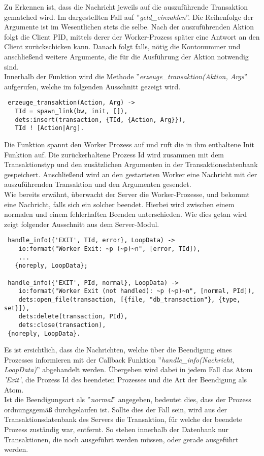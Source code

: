 Zu Erkennen ist, dass die Nachricht jeweils auf die auszuführende Transaktion gematched wird. Im dargestellten Fall auf ''\textit{geld\_einzahlen}''. Die Reihenfolge der Argumente ist im Wesentlichen stets die selbe. Nach der auszuführenden Aktion folgt die Client PID, mittels derer der Worker-Prozess später eine Antwort an den Client zurückschicken kann. Danach folgt falls, nötig die Kontonummer und anschließend weitere Argumente, die für die Ausführung der Aktion notwendig sind.\\
Innerhalb der Funktion wird die Methode ''\textit{erzeuge\_transaktion(Aktion, Args}'' aufgerufen, welche im folgenden Ausschnitt gezeigt wird.
\begin{lstlisting}
 erzeuge_transaktion(Action, Arg) ->
   TId = spawn_link(bw, init, []),
   dets:insert(transaction, {TId, {Action, Arg}}),
   TId ! [Action|Arg].
\end{lstlisting}
Die Funktion spannt den Worker Prozess auf und ruft die in ihm enthaltene Init Funktion auf. Die zurückerhaltene Prozess Id wird zusammen mit dem Transaktionstyp und den zusätzlichen Argumenten in der Transaktionsdatenbank gespeichert. Anschließend wird an den gestarteten Worker eine Nachricht mit der auszuführenden Transaktion und den Argumenten gesendet.\\
Wie bereits erwähnt, überwacht der Server die Worker-Prozesse, und bekommt eine Nachricht, falls sich ein solcher beendet. Hierbei wird zwischen einem normalen und einem fehlerhaften Beenden unterschieden. Wie dies getan wird zeigt folgender Ausschnitt aus dem Server-Modul.
\begin{lstlisting}
 handle_info({'EXIT', TId, error}, LoopData) -> 
    io:format("Worker Exit: ~p (~p)~n", [error, TId]),
    ...
   {noreply, LoopData};

 handle_info({'EXIT', PId, normal}, LoopData) -> 
    io:format("Worker Exit (not handled): ~p (~p)~n", [normal, PId]),
    dets:open_file(transaction, [{file, "db_transaction"}, {type, set}]),
    dets:delete(transaction, PId),
    dets:close(transaction),
 {noreply, LoopData}.
\end{lstlisting}
Es ist ersichtlich, dass die Nachrichten, welche über die Beendigung eines Prozesses informieren mit der Callback Funktion ''\textit{handle\_info(Nachricht, LoopData)}'' abgehandelt werden. Übergeben wird dabei in jedem Fall das Atom \textit{'Exit'}, die Prozess Id des beendeten Prozesses und die Art der Beendigung als Atom.\\
Ist die Beendigungsart als ''\textit{normal}'' angegeben, bedeutet dies, dass der Prozess ordnungsgemäß durchgelaufen ist. Sollte dies der Fall sein, wird aus der Transaktionsdatenbank des Servers die Transaktion, für welche der beendete Prozess zuständig war, entfernt. So stehen innerhalb der Datenbank nur Transaktionen, die noch ausgeführt werden müssen, oder gerade ausgeführt werden.\\

